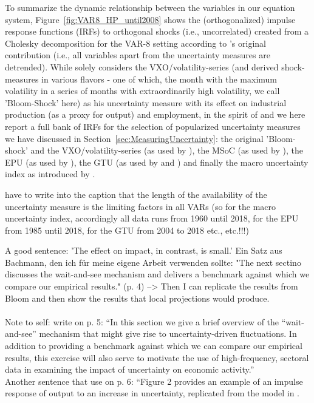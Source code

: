\documentclass[a4paper,11pt,listof=nochaptergap,oneside,pointednumbers,bibtotoc,bigheadings,liststotoc]{scrbook}
\theoremstyle{mysatz}
\theoremstyle{mydefinition}
\theoremstyle{mybemerkung}
\begin{document}
To summarize the dynamic relationship between the variables in our equation system, Figure~\ref{fig:VAR8_HP_until2008} shows the (orthogonalized) impulse response functions (IRFs) to orthogonal shocks (i.e., uncorrelated) created from a Cholesky decomposition for the VAR-8 setting according to \citet{bloom:09}'s original contribution (i.e., all variables apart from the uncertainty measures are detrended). While \citet{bloom:09} solely considers the VXO/volatility-series (and derived shock-measures in various flavors - one of which, the month with the maximum volatility in a series of months with extraordinarily high volatility, we call 'Bloom-Shock' here) as his uncertainty measure with its effect on industrial production (as a proxy for output) and employment, in the spirit of \citet{juradoetal:15} and \citet{bontempietal:16} we here report a full bank of IRFs for the selection of popularized uncertainty measures we have discussed in Section~\ref{sec:MeasuringUncertainty}: the original 'Bloom-shock' and the VXO/volatility-series (as used by \citealp{bloom:09}), the MSoC (as used by \citealp{leducandliu:16}), the EPU (as used by \citealp{bakeretal:15}), the GTU (as used by \citealp{bontempietal:16} and \citealp{castelnuovoandtran:17}) and finally the macro uncertainty index as introduced by \citet{juradoetal:15}.


have to write into the caption that the length of the availability of the uncertainty measure is the limiting factors in all VARs (so for the macro uncertainty index, accordingly all data runs from 1960 until 2018, for the EPU from 1985 until 2018, for the GTU from 2004 to 2018 etc., etc.!!!)



A good sentence: 'The effect on impact, in contrast, is small.' 
Ein Satz aus Bachmann, den ich für meine eigene Arbeit verwenden sollte: "The next sectino discusses the wait-and-see mechanism and delivers a benchmark against which we compare our empirical results." (p. 4) --> Then I can replicate the results from Bloom and then show the results that local projections would produce.\\
\\
Note to self: \citet{bachmannetal:13} write on p. 5: ``In this section we give a brief overview of the ``wait-and-see'' mechanism that might give rise to uncertainty-driven fluctuations. In addition to providing a benchmark against which we can compare our empirical results, this exercise will also serve to motivate the use of high-frequency, sectoral data in examining the impact of uncertainty on economic activity.''\\
Another sentence that \citet{bachmannetal:13} use on p. 6: ``Figure 2 provides an example of an impulse response of output to an increase in uncertainty, replicated from the model in \citet{bloom:09}.
\end{document}
